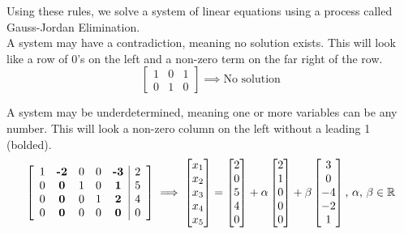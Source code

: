\noindent
Using these rules, we solve a system of linear equations using a process called Gauss-Jordan Elimination.\\

\noindent
A system may have a contradiction, meaning no solution exists. This will look like a row of 0's on the left and a non-zero term on the far right of the row.
\begin{equation*}
	\left[
		\begin{array}{cc|c}
		1 & 0 & 1 \\
		0 & 1 & 0
		\end{array}
	\right]
	\implies
	\text{No solution}
\end{equation*}

\noindent
A system may be underdetermined, meaning one or more variables can be any number. This will look a non-zero column on the left without a leading 1 (bolded).
\begin{equation*}
	\left[
		\begin{array}{ccccc|c}
			1 & \textbf{-2} & 0 & 0 & \textbf{-3} & 2 \\
			0 & \textbf{0} & 1 & 0 & \textbf{1} & 5 \\
			0 & \textbf{0} & 0 & 1 & \textbf{2} & 4 \\
			0 & \textbf{0} & 0 & 0 & \textbf{0} & 0
		\end{array}
	\right]
	\implies
	\begin{bmatrix}
		x_1 \\
		x_2 \\
		x_3 \\
		x_4 \\
		x_5 \\
	\end{bmatrix} = \begin{bmatrix}
		2 \\
		0 \\
		5 \\
		4 \\
		0
	\end{bmatrix} + \alpha \begin{bmatrix}
		2 \\
		1 \\
		0 \\
		0 \\
		0
	\end{bmatrix} + \beta \begin{bmatrix}
		3 \\
		0 \\
		-4 \\
		-2 \\
		1
	\end{bmatrix} \text{, }\alpha\text{, }\beta \in \mathbb{R}
\end{equation*}

\ifodd{}\fi
